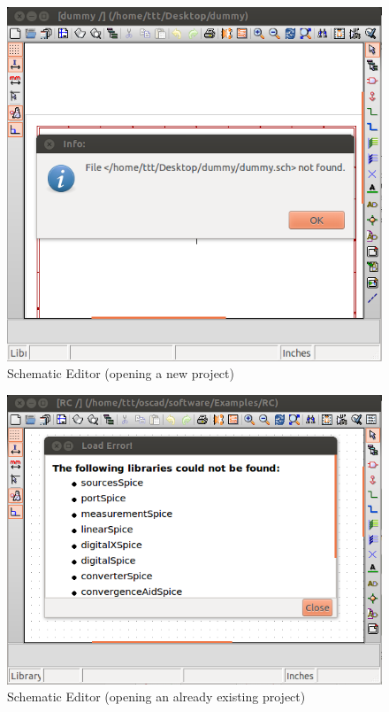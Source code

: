 \begin{figure}
\begin{center}
\includegraphics[width=0.8\linewidth]{figures/schematic-editor-newprj.png}
\caption{Schematic Editor (opening a new project)}
\label{schematic-editor-newprj}
\end{center}
\end{figure}


\begin{figure}
\begin{center}
\includegraphics[width=0.8\linewidth]{figures/schematic-editor-existingprj.png}
\caption{Schematic Editor (opening an already existing project)}
\label{schematic-editor-existing}
\end{center}
\end{figure}



